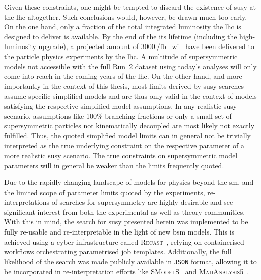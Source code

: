 Given these constraints, one might be tempted to discard the existence of \gls{susy} at the \gls{lhc} altogether. Such conclusions would, however, be drawn much too early. On the one hand, only a fraction of the total integrated luminosity the \gls{lhc} is designed to deliver is available. By the end of the its lifetime (including the high-luminosity upgrade), a projected amount of $\SI{3000}{\per\femto\barn}$~\cite{Apollinari:2116337} will have been delivered to the particle physics experiments by the \gls{lhc}. A multitude of supersymmetric models not accessible with the full Run~2 dataset using today's analyses will only come into reach in the coming years of the \gls{lhc}.
On the other hand, and more importantly in the context of this thesis, most limits derived by \gls{susy} searches assume specific simplified models and are thus only valid in the context of models satisfying the respective simplified model assumptions. In any realistic \gls{susy} scenario, assumptions like 100\% branching fractions or only a small set of supersymmetric particles not kinematically decoupled are most likely not exactly fulfilled. Thus, the quoted simplified model limits can in general not be trivially interpreted as the true underlying constraint on the respective parameter of a more realistic \gls{susy} scenario. The true constraints on supersymmetric model parameters will in general be weaker than the limits frequently quoted.
 
Due to the rapidly changing landscape of models for physics beyond the \gls{sm}, and the limited scope of parameter limits quoted by the experiments, re-interpretations of searches for supersymmetry are highly desirable and see significant interest from both the experimental as well as theory communities. With this in mind, the search for \gls{susy} presented herein was implemented to be fully re-usable and re-interpretable in the light of new \gls{bsm} models. This is achieved using a cyber-infrastructure called \textsc{Recast}~\cite{RECAST_cranmer}, relying on containerised workflows orchestrating parametrised job templates. Additionally, the full likelihood of the search was made publicly available in \texttt{JSON} format, allowing it to be incorporated in re-interpretation efforts like \textsc{SModelS}~\cite{SModelS1:2013mwa,SModelS2:2017neo} and \textsc{MadAnalysis5}~\cite{Goodsell:2020ddr,Fuks:2021wpe}. 
 

